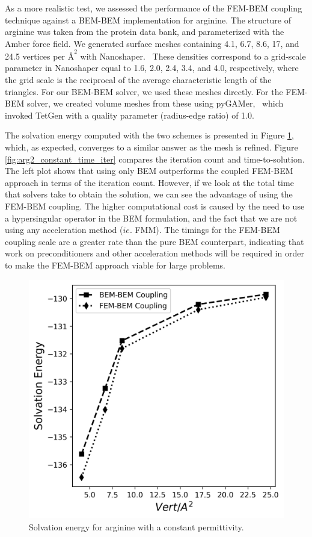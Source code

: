 As a more realistic test, we assessed the performance of the FEM-BEM coupling technique against a BEM-BEM implementation for arginine.
The structure of arginine was taken from the protein data bank, and parameterized with the Amber\cite{ponder2003force} force field. 
We generated surface meshes containing 4.1, 6.7, 8.6, 17, and 24.5 vertices per $\text{\AA}^2$ with Nanoshaper.~\cite{decherchi2013general}
These densities correspond to a grid-scale parameter in Nanoshaper equal to 1.6, 2.0, 2.4, 3.4, and 4.0, respectively, where the grid scale is the reciprocal of the average characteristic length of the triangles.
For our BEM-BEM solver, we used these meshes directly. For the FEM-BEM solver, we created volume meshes from these using pyGAMer,~\cite{lee2020open} which invoked TetGen\cite{hang2015tetgen} with a quality parameter (radius-edge ratio) of 1.0.

The solvation energy computed with the two schemes is presented in Figure \ref{fig:arg_constant_energy}, which, as expected, converges to a similar answer as the mesh is refined.
Figure \ref{fig:arg2_constant_time_iter} compares the iteration count and time-to-solution. The left plot shows that using only BEM outperforms the coupled FEM-BEM approach in terms of the iteration count. However, if we look at the total time that solvers take to obtain the solution, we can see the advantage of using the FEM-BEM coupling. The higher computational cost is caused by the need to use a hypersingular operator in the BEM formulation, and the fact that we are not using any acceleration method ($ie.$ FMM).
The timings for the FEM-BEM coupling scale are a greater rate than the pure BEM counterpart, indicating that work on preconditioners and other acceleration methods will be required in order to make
the FEM-BEM approach viable for large problems.


\begin{figure}
\centering
   \includegraphics[width=0.45\linewidth]{DolfinX_Arginine2_const_coeff_error.png}
\caption{Solvation energy for arginine with a constant permittivity.}
\label{fig:arg_constant_energy}
\end{figure}

